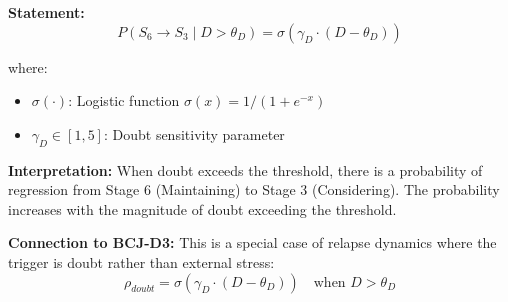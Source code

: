 \begin{tcolorbox}[colback=gray!5!white, colframe=gray!75!black,
    title=Axiom BCJ-AP3: Doubt-Triggered Redeliberation]
\textbf{Statement:}
\begin{equation}
P(S_6 \to S_3 \mid D > \theta_D) = \sigma(\gamma_D \cdot (D - \theta_D))
\end{equation}

where:
\begin{itemize}[nosep]
\item $\sigma(\cdot)$: Logistic function $\sigma(x) = 1/(1+e^{-x})$
\item $\gamma_D \in [1, 5]$: Doubt sensitivity parameter
\end{itemize}

\textbf{Interpretation:} When doubt exceeds the threshold, there is a probability of regression from Stage 6 (Maintaining) to Stage 3 (Considering). The probability increases with the magnitude of doubt exceeding the threshold.

\textbf{Connection to BCJ-D3:} This is a special case of relapse dynamics where the trigger is doubt rather than external stress:
\begin{equation}
\rho_{doubt} = \sigma(\gamma_D \cdot (D - \theta_D)) \quad \text{when } D > \theta_D
\end{equation}
\end{tcolorbox}

